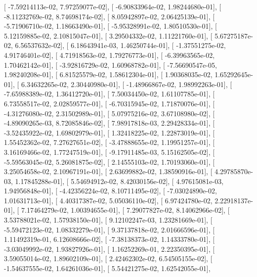 \documentclass{article}
\begin{document}
       [ -7.59214113e-02,   7.97259077e-02],
       [ -6.90833964e-02,   1.98244680e-01],
       [ -8.11232769e-02,   8.74698174e-02],
       [  8.05942897e-02,   2.06425139e-01],
       [ -5.71906710e-02,   1.18663490e-01],
       [ -5.95328991e-02,   1.80510530e-01],
       [  5.12159885e-02,   2.10815047e-01],
       [  3.29504332e-02,   1.11221760e-01],
       [  5.67275187e-02,   6.56537632e-02],
       [  6.18643941e-03,   1.46250744e-01],
       [ -1.37551275e-02,   4.91746401e-02],
       [  4.71918563e-02,   1.79276773e-01],
       [ -6.39963565e-02,   1.70462142e-01],
       [ -3.92816729e-02,   1.60968782e-01],
       [ -7.56690547e-05,   1.98240208e-01],
       [  6.81525579e-02,   1.58612304e-01],
       [  1.90368035e-02,   1.65292645e-01],
       [  6.34632265e-02,   2.30440980e-01],
       [ -1.48966867e-02,   1.98992263e-01],
       [ -7.65988389e-02,   1.36412720e-01],
       [  7.50034450e-02,   1.61107785e-01],
       [  6.73558517e-02,   2.02859577e-01],
       [ -6.70315945e-02,   1.71870076e-01],
       [ -4.31276080e-02,   2.31502989e-01],
       [  5.07975216e-02,   3.67108980e-02],
       [ -4.89090265e-03,   8.72085846e-02],
       [  7.98917818e-03,   2.29428334e-01],
       [ -3.52435922e-02,   1.69802979e-01],
       [  1.32418225e-02,   1.22873019e-01],
       [  1.55452362e-02,   7.27627651e-02],
       [ -3.47888655e-02,   1.19951257e-01],
       [  3.16169466e-02,   1.77247519e-01],
       [ -9.17911485e-03,   5.15162505e-02],
       [ -5.59563045e-02,   5.26081875e-02],
       [  2.14555103e-02,   1.70193060e-01],
       [  3.25054658e-02,   2.10967191e-01],
       [  2.63699882e-02,   1.38590916e-01],
       [  4.29785870e-03,   1.17845288e-01],
       [  5.54694912e-02,   8.42030156e-02],
       [  4.97615081e-03,   1.94956848e-01],
       [ -4.42356224e-02,   8.10711495e-02],
       [ -7.03024890e-02,   1.01631713e-01],
       [  4.40317387e-02,   5.05036110e-02],
       [  6.97424780e-02,   2.22918137e-01],
       [  7.17464279e-02,   1.00394655e-01],
       [  7.29077827e-02,   8.14062966e-02],
       [  3.53788021e-02,   1.57938150e-01],
       [  9.12102247e-03,   1.23281669e-01],
       [ -5.59472123e-02,   1.08332279e-01],
       [  9.37137818e-02,   2.01666596e-01],
       [  1.11492319e-01,   6.12608666e-02],
       [ -7.38138373e-02,   1.14333780e-01],
       [ -3.03049992e-02,   1.93827926e-01],
       [  1.16252269e-01,   2.22350395e-01],
       [  3.59055014e-02,   1.89602109e-01],
       [  2.42462302e-02,   6.54505155e-02],
       [ -1.54637555e-02,   1.64261036e-01],
       [  5.54421275e-02,   1.62542055e-01],
\end{document}
